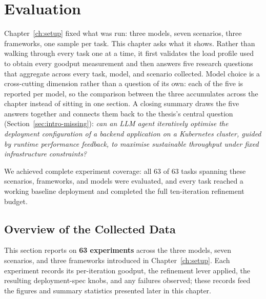 
\chapter{Evaluation}
\label{ch:results}

Chapter~\ref{ch:setup} fixed what was run: three models, seven scenarios,
three frameworks, one sample per task. This chapter asks what it shows.
Rather than walking through every task one at a time, it first validates
the load profile used to obtain every goodput measurement and then answers
five research questions that aggregate across every task, model, and
scenario collected. Model choice is a cross-cutting dimension rather than a
question of its own: each of the five is reported per model, so the
comparison between the three accumulates across the chapter instead of
sitting in one section. A closing summary draws the five answers together
and connects them back to the thesis's central
question (Section~\ref{sec:intro-missing}): \emph{can an LLM agent
iteratively optimise the deployment configuration of a backend application
on a Kubernetes cluster, guided by runtime performance feedback, to
maximise sustainable throughput under fixed infrastructure constraints?}

We achieved complete experiment coverage: all 63 of 63 tasks spanning
these scenarios, frameworks, and models were evaluated, and every task
reached a working baseline deployment and completed the full
ten-iteration refinement budget.


\section{Overview of the Collected Data}
\label{sec:results-overview}

This section reports on \textbf{63 experiments} across the three models,
seven scenarios, and three frameworks introduced in
Chapter~\ref{ch:setup}. Each experiment records its per-iteration
goodput, the refinement lever applied, the resulting deployment-spec
knobs, and any failures observed; these records feed the figures and
summary statistics presented later in this chapter.


